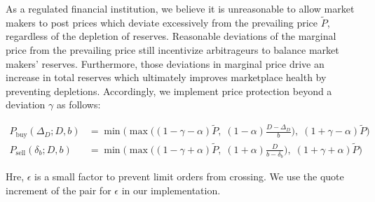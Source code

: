\documentclass{article}
\begin{document}
As a regulated financial institution, we believe it is unreasonable to allow market makers to post prices which deviate excessively from the prevailing price $\tilde{P}$, regardless of the depletion of reserves. Reasonable deviations of the marginal price from the prevailing price still incentivize arbitrageurs to balance market makers' reserves. Furthermore, those deviations in marginal price drive an increase in total reserves which ultimately improves marketplace health by preventing depletions. Accordingly, we implement price protection beyond a deviation $\gamma$ as follows:

\begin{equation}
\begin{split}
P_{\mathrm{buy}}(\Delta_D; D, b) &= \min \Big( \max \big( (1 - \gamma - \alpha)\tilde{P}, \; (1 - \alpha) \frac{D - \Delta_D}{b} \big), \; (1 + \gamma - \alpha) \tilde{P} \Big) \\
P_{\mathrm{sell}}(\delta_b; D, b) &= \min \Big( \max \big( (1 - \gamma + \alpha) \tilde{P}, \; (1 + \alpha) \frac{D}{b - \delta_b} \big), \; (1 + \gamma + \alpha)\tilde{P} \Big)
\end{split}
\end{equation}

Hre, $\epsilon$ is a small factor to prevent limit orders from crossing. We use the quote increment of the pair for $\epsilon$ in our implementation.

  
\end{document}
